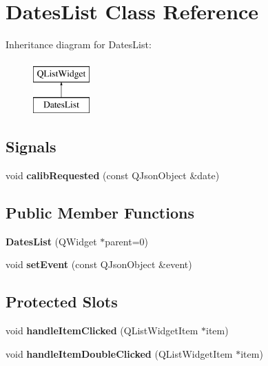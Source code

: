 \hypertarget{class_dates_list}{\section{Dates\-List Class Reference}
\label{class_dates_list}
}
Inheritance diagram for Dates\-List\-:\begin{figure}[H]
\begin{center}
\leavevmode
\includegraphics[height=2.000000cm]{class_dates_list}
\end{center}
\end{figure}
\subsection*{Signals}
\begin{DoxyCompactItemize}
\item 
\hypertarget{class_dates_list_aa896c4e91f0b8574cc5265a1727c8e88}{void {\bfseries calib\-Requested} (const Q\-Json\-Object \&date)}\label{class_dates_list_aa896c4e91f0b8574cc5265a1727c8e88}

\end{DoxyCompactItemize}
\subsection*{Public Member Functions}
\begin{DoxyCompactItemize}
\item 
\hypertarget{class_dates_list_a493d222c9b4d9c6b7f766d8b8ee7b0ec}{{\bfseries Dates\-List} (Q\-Widget $\ast$parent=0)}\label{class_dates_list_a493d222c9b4d9c6b7f766d8b8ee7b0ec}

\item 
\hypertarget{class_dates_list_a82c946adc61720091eefee7b36467834}{void {\bfseries set\-Event} (const Q\-Json\-Object \&event)}\label{class_dates_list_a82c946adc61720091eefee7b36467834}

\end{DoxyCompactItemize}
\subsection*{Protected Slots}
\begin{DoxyCompactItemize}
\item 
\hypertarget{class_dates_list_a0316972c7ddac974aa3d2affab2d1817}{void {\bfseries handle\-Item\-Clicked} (Q\-List\-Widget\-Item $\ast$item)}\label{class_dates_list_a0316972c7ddac974aa3d2affab2d1817}

\item 
\hypertarget{class_dates_list_aeca2c27d23f19dc4de7553dd7ed7f1ec}{void {\bfseries handle\-Item\-Double\-Clicked} (Q\-List\-Widget\-Item $\ast$item)}\label{class_dates_list_aeca2c27d23f19dc4de7553dd7ed7f1ec}

\end{DoxyCompactItemize}
